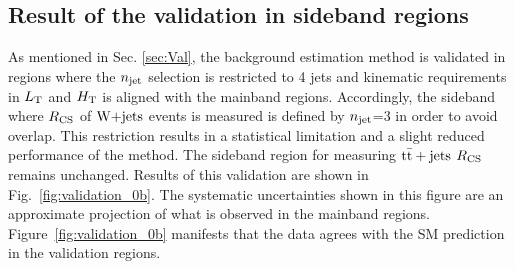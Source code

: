 \subsection{Result of the validation in sideband regions}
\label{sec:ResVal}
As mentioned in Sec. \ref{sec:Val}, the background estimation method is validated in regions where the $n_{\rm jet}$ selection is restricted to 4 jets and kinematic requirements in $L_{\rm T}$ and $H_{\rm T}$ is aligned with the mainband regions.
Accordingly, the sideband where $R_{\rm CS}$ of $\textrm{W+jets}$ events is measured is defined by $n_{\rm jet}$=3 in order to avoid overlap.
This restriction results in a statistical limitation and a slight reduced performance of the method.
The sideband region for measuring ${\rm t\bar{t}+jets}$ $R_{\rm CS}$ remains unchanged.
Results of this validation are shown in Fig.~\ref{fig:validation_0b}.
The systematic uncertainties shown in this figure are an approximate projection of what is observed in the mainband regions. Figure~\ref{fig:validation_0b} manifests that the data agrees with the SM prediction in the validation regions.
